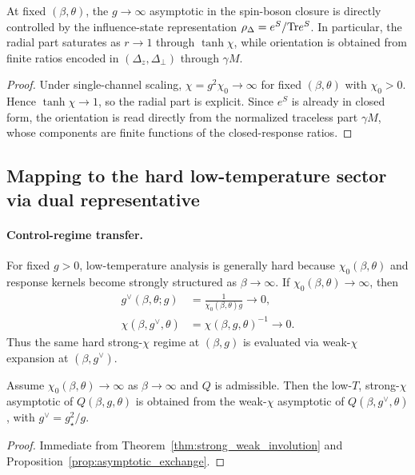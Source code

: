 \begin{proposition}
\label{prop:easy_limit_spin_boson}
At fixed \((\beta,\theta)\), the \(g\to\infty\) asymptotic in the spin-boson closure is directly
controlled by the influence-state representation \(\rho_\Delta=e^S/\mathrm{Tr} e^S\). In particular, the
radial part saturates as \(r\to 1\) through \(\tanh\chi\), while orientation is obtained from finite
ratios encoded in \((\Delta_z,\Delta_\perp)\) through \(\gamma M\).
\end{proposition}
\begin{proof}
Under single-channel scaling, \(\chi=g^2\chi_0\to\infty\) for fixed \((\beta,\theta)\) with
\(\chi_0>0\). Hence \(\tanh\chi\to 1\), so the radial part is explicit. Since \(e^S\) is already in
closed form, the orientation is read directly from the normalized traceless part \(\gamma M\), whose
components are finite functions of the closed-response ratios.
\end{proof}

\subsection{Mapping to the hard low-temperature sector via dual representative}

\paragraph{Control-regime transfer.}
For fixed \(g>0\), low-temperature analysis is generally hard because \(\chi_0(\beta,\theta)\) and
response kernels become strongly structured as \(\beta\to\infty\). If
\(\chi_0(\beta,\theta)\to\infty\), then
\begin{align}
  g^\vee(\beta,\theta;g) &= \frac{1}{\chi_0(\beta,\theta)g}\to 0, \\
  \chi(\beta,g^\vee,\theta) &= \chi(\beta,g,\theta)^{-1}\to 0.
\end{align}
Thus the same hard strong-\(\chi\) regime at \((\beta,g)\) is evaluated via weak-\(\chi\) expansion
at \((\beta,g^\vee)\).

\begin{corollary}
\label{cor:hard_limit_transfer}
Assume \(\chi_0(\beta,\theta)\to\infty\) as \(\beta\to\infty\) and \(Q\) is admissible. Then the
low-\(T\), strong-\(\chi\) asymptotic of \(Q(\beta,g,\theta)\) is obtained from the weak-\(\chi\)
asymptotic of \(Q(\beta,g^\vee,\theta)\), with \(g^\vee=g_\star^2/g\).
\end{corollary}
\begin{proof}
Immediate from Theorem~\ref{thm:strong_weak_involution} and
Proposition~\ref{prop:asymptotic_exchange}.
\end{proof}

